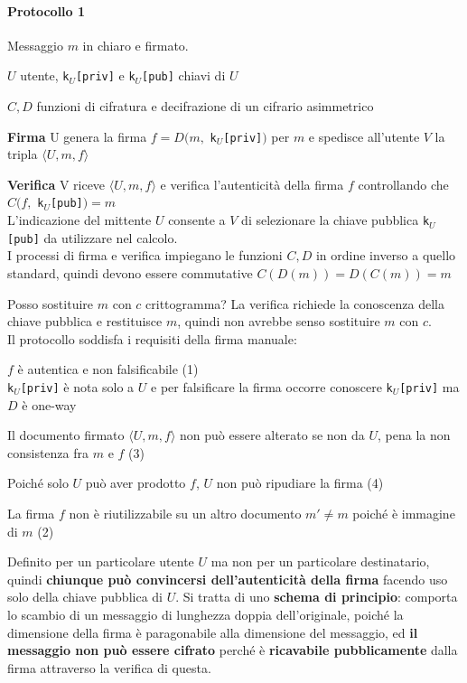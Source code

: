 \documentclass[10pt]{book}
\begin{document}
\paragraph{Protocollo 1} Messaggio $m$ in chiaro e firmato.
\begin{list}{}{}
	\item $U$ utente, \texttt{k$_U$[priv]} e \texttt{k$_U$[pub]} chiavi di $U$
	\item $C,D$ funzioni di cifratura e decifrazione di un cifrario asimmetrico
	\item \textbf{Firma} U genera la firma $f = D(m,$ \texttt{k$_U$[priv]}$)$ per $m$ e spedisce all'utente $V$ la tripla $\langle U,m,f\rangle$
	\pagebreak
	\item \textbf{Verifica} V riceve $\langle U,m,f\rangle$ e verifica l'autenticità della firma $f$ controllando che $C(f,$ \texttt{k$_U$[pub]}$) = m$\\
	L'indicazione del mittente $U$ consente a $V$ di selezionare la chiave pubblica \texttt{k$_U$[pub]} da utilizzare nel calcolo.\\
I processi di firma e verifica impiegano le funzioni $C,D$ in ordine inverso a quello standard, quindi devono essere commutative $C(D(m)) = D(C(m)) = m$	
\end{list}
Posso sostituire $m$ con $c$ crittogramma? La verifica richiede la conoscenza della chiave pubblica e restituisce $m$, quindi non avrebbe senso sostituire $m$ con $c$.\\
Il protocollo soddisfa i requisiti della firma manuale:
\begin{list}{}{}
	\item $f$ è autentica e non falsificabile (1)\\
	\texttt{k$_U$[priv]} è nota solo a $U$ e per falsificare la firma occorre conoscere \texttt{k$_U$[priv]} ma $D$ è one-way
	\item Il documento firmato $\langle U,m,f\rangle$ non può essere alterato se non da $U$, pena la non consistenza fra $m$ e $f$ (3)
	\item Poiché solo $U$ può aver prodotto $f$, $U$ non può ripudiare la firma (4)
	\item La firma $f$ non è riutilizzabile su un altro documento $m'\neq m$ poiché è immagine di $m$ (2)
\end{list}
Definito per un particolare utente $U$ ma non per un particolare destinatario, quindi \textbf{chiunque può convincersi dell'autenticità della firma} facendo uso solo della chiave pubblica di $U$. Si tratta di uno \textbf{schema di principio}: comporta lo scambio di un messaggio di lunghezza doppia dell'originale, poiché la dimensione della firma è paragonabile alla dimensione del messaggio, ed \textbf{il messaggio non può essere cifrato} perché è \textbf{ricavabile pubblicamente} dalla firma attraverso la verifica di questa.
\end{document}
